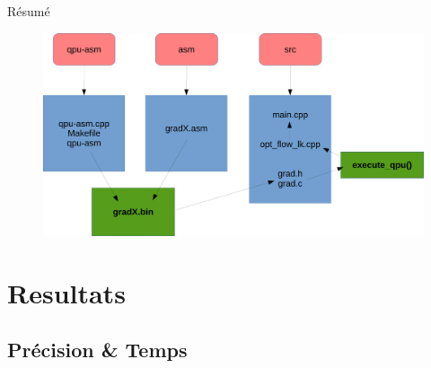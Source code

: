 \documentclass{bredelebeamer}
\begin{document}

\begin{frame}{Résumé}

\begin{figure}
\centering
\includegraphics[scale=0.3]{images/projectResume.pdf}
\end{figure}

\end{frame}





\section{Resultats}


\subsection{Précision \& Temps}

\end{document}

